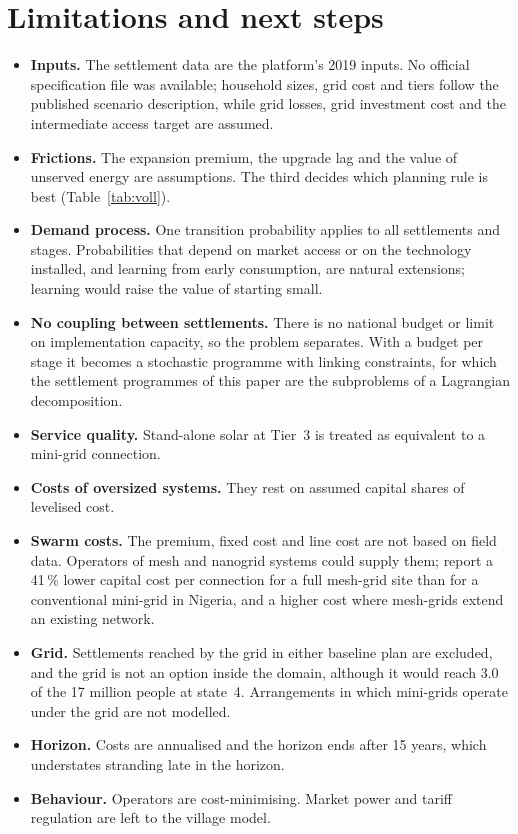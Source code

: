 \documentclass[11pt,a4paper]{article}
\begin{document}
\section{Limitations and next steps}\label{sec:limits}
\begin{itemize}
\item \textbf{Inputs.} The settlement data are the platform's 2019 inputs. No official specification file was
available; household sizes, grid cost and tiers follow the published scenario description, while grid losses,
grid investment cost and the intermediate access target are assumed.
\item \textbf{Frictions.} The expansion premium, the upgrade lag and the value of unserved energy are assumptions.
The third decides which planning rule is best (Table~\ref{tab:voll}).
\item \textbf{Demand process.} One transition probability applies to all settlements and stages. Probabilities that
depend on market access or on the technology installed, and learning from early consumption, are natural
extensions; learning would raise the value of starting small.
\item \textbf{No coupling between settlements.} There is no national budget or limit on implementation capacity, so
the problem separates. With a budget per stage it becomes a stochastic programme with linking constraints, for
which the settlement programmes of this paper are the subproblems of a Lagrangian decomposition.
\item \textbf{Service quality.} Stand-alone solar at Tier~3 is treated as equivalent to a mini-grid connection.
\item \textbf{Costs of oversized systems.} They rest on assumed capital shares of levelised cost.
\item \textbf{Swarm costs.} The premium, fixed cost and line cost are not based on field data. Operators of mesh
and nanogrid systems could supply them; \citet{crossboundary2025} report a 41\,\% lower capital cost per connection
for a full mesh-grid site than for a conventional mini-grid in Nigeria, and a higher cost where mesh-grids extend an
existing network.
\item \textbf{Grid.} Settlements reached by the grid in either baseline plan are excluded, and the grid is not an
option inside the domain, although it would reach 3.0 of the 17 million people at state~4. Arrangements in which
mini-grids operate under the grid \citep{gonzalezgrandon2021} are not modelled.
\item \textbf{Horizon.} Costs are annualised and the horizon ends after 15 years, which understates stranding late
in the horizon.
\item \textbf{Behaviour.} Operators are cost-minimising. Market power and tariff regulation
\citep{bougebrael2026} are left to the village model.
\end{itemize}
\end{document}

